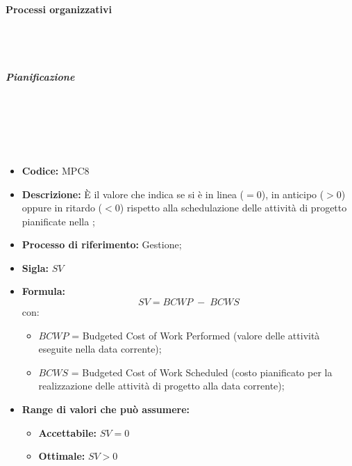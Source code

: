     \paragraph{Processi organizzativi}\mbox{}\\ \\

\subparagraph{Pianificazione}\mbox{}\\ \\
    \mbox{}\\ \\
    \begin{itemize}
        \item \textbf{Codice:} MPC8
        \item \textbf{Descrizione:} È il valore che indica se si è in linea ($=0$), in anticipo ($>0$) oppure in ritardo ($<0$) rispetto alla schedulazione delle attività di progetto pianificate nella ;
        \item \textbf{Processo di riferimento:} Gestione;
        \item \textbf{Sigla:} $SV$
        \item \textbf{Formula:} $$SV = {BCWP \; - \; BCWS}$$
        con:
        \begin{itemize}
            \item $BCWP$ = Budgeted Cost of Work Performed (valore delle attività eseguite nella data corrente);
            \item $BCWS$ = Budgeted Cost of Work Scheduled (costo pianificato per la realizzazione delle attività di progetto alla data corrente);
        \end{itemize}
        \item \textbf{Range di valori che può assumere:}
        \begin{itemize}
            \item \textbf{Accettabile:} $SV = 0$
            \item \textbf{Ottimale:} $SV > 0$
        \end{itemize}
    \end{itemize}


